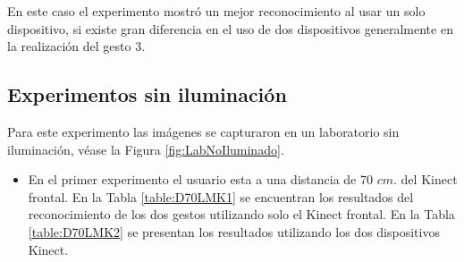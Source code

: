 \begin{itemize}
En este caso el experimento mostró un mejor reconocimiento al usar un solo dispositivo, si existe gran diferencia en el uso de dos dispositivos generalmente en la realización del gesto 3.

\end{itemize}


\subsection{Experimentos sin iluminación}
Para este experimento las imágenes se capturaron en un laboratorio sin iluminación, véase la Figura \ref{fig:LabNoIluminado}.

\begin{itemize}

\item En el primer experimento el usuario esta a una distancia de $70$ $cm.$ del Kinect frontal. En la Tabla \ref{table:D70LMK1} se encuentran los resultados del reconocimiento de los dos gestos utilizando solo el Kinect frontal. En la Tabla \ref{table:D70LMK2} se presentan los resultados utilizando los dos dispositivos Kinect. 

%


\end{itemize}
